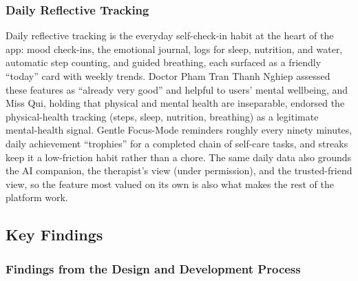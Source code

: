 \subsubsection{Daily Reflective Tracking}

Daily reflective tracking is the everyday self-check-in habit at the heart of the app: mood check-ins, the emotional journal, logs for sleep, nutrition, and water, automatic step counting, and guided breathing, each surfaced as a friendly ``today'' card with weekly trends. Doctor Pham Tran Thanh Nghiep assessed these features as ``already very good'' and helpful to users' mental wellbeing, and Miss Qui, holding that physical and mental health are inseparable, endorsed the physical-health tracking (steps, sleep, nutrition, breathing) as a legitimate mental-health signal. Gentle Focus-Mode reminders roughly every ninety minutes, daily achievement ``trophies'' for a completed chain of self-care tasks, and streaks keep it a low-friction habit rather than a chore. The same daily data also grounds the AI companion, the therapist's view (under permission), and the trusted-friend view, so the feature most valued on its own is also what makes the rest of the platform work.

\subsection{Key Findings}
\label{sec:expert-findings}

\subsubsection{Findings from the Design and Development Process}

